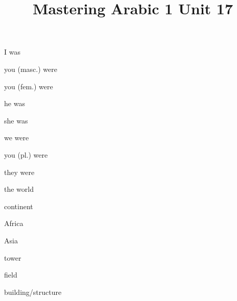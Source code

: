 \documentclass[avery5371,grid,frame]{flashcards}
\title{Mastering Arabic 1 Unit 17}
\begin{document}
\begin{flashcard}{\LARGE I was}
\LARGE {}
\end{flashcard}
\begin{flashcard}{\LARGE you (masc.) were}
\LARGE {}
\end{flashcard}
\begin{flashcard}{\LARGE you (fem.) were}
\LARGE {}
\end{flashcard}
\begin{flashcard}{\LARGE he was}
\LARGE {}
\end{flashcard}
\begin{flashcard}{\LARGE she was}
\LARGE {}
\end{flashcard}
\begin{flashcard}{\LARGE we were}
\LARGE {}
\end{flashcard}
\begin{flashcard}{\LARGE you (pl.) were}
\LARGE {}
\end{flashcard}
\begin{flashcard}{\LARGE they were}
\LARGE {}
\end{flashcard}
\begin{flashcard}{\LARGE the world}
\LARGE {}
\end{flashcard}
\begin{flashcard}{\LARGE continent}
\LARGE {}
\end{flashcard}
\begin{flashcard}{\LARGE Africa}
\LARGE {}
\end{flashcard}
\begin{flashcard}{\LARGE Asia}
\LARGE {}
\end{flashcard}
\begin{flashcard}{\LARGE tower}
\LARGE {}
\end{flashcard}
\begin{flashcard}{\LARGE field}
\LARGE {}
\end{flashcard}
\begin{flashcard}{\LARGE building/structure}
\LARGE {}
\end{flashcard}
\end{document}
